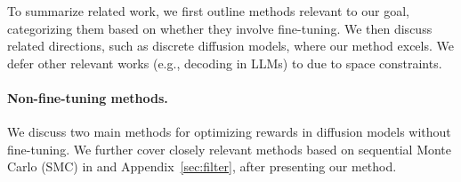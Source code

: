 To summarize related work, we first outline methods relevant to our goal, categorizing them based on whether they involve fine-tuning. We then discuss related directions, such as discrete diffusion models, where our method excels. We defer other relevant works (e.g., decoding in LLMs) to  due to space constraints. 

\vspace{-2mm}
\paragraph{Non-fine-tuning methods.}

We discuss two main methods for optimizing rewards in diffusion models without fine-tuning. { We further cover closely relevant methods based on sequential Monte Carlo (SMC) in  and Appendix~\ref{sec:filter}, after presenting our method.}
\vspace{-2mm}
